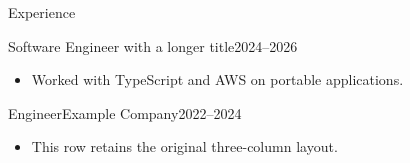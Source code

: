 \documentclass[portable]{mcdowellcv}
\begin{document}
\makeheader
\begin{cvsection}{Experience}
  \begin{cvsubsection}{Software Engineer with a longer title}{}{2024--2026}
    \begin{itemize}
      \item Worked with TypeScript and AWS on portable applications.
    \end{itemize}
  \end{cvsubsection}
  \begin{cvsubsection}{Engineer}{Example Company}{2022--2024}
    \begin{itemize}
      \item This row retains the original three-column layout.
    \end{itemize}
  \end{cvsubsection}
\end{cvsection}
\end{document}
